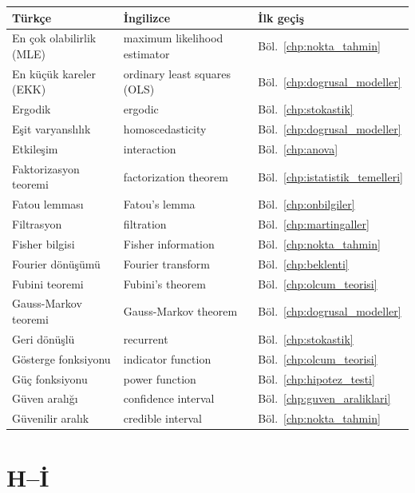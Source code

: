 \begin{tabular}{p{5cm}p{5cm}p{4cm}}
\hline
\textbf{Türkçe} & \textbf{İngilizce} & \textbf{İlk geçiş} \\
\hline
En çok olabilirlik (MLE) & maximum likelihood estimator & Böl.~\ref{chp:nokta_tahmin} \\
En küçük kareler (EKK) & ordinary least squares (OLS) & Böl.~\ref{chp:dogrusal_modeller} \\
Ergodik & ergodic & Böl.~\ref{chp:stokastik} \\
Eşit varyanslılık & homoscedasticity & Böl.~\ref{chp:dogrusal_modeller} \\
Etkileşim & interaction & Böl.~\ref{chp:anova} \\
Faktorizasyon teoremi & factorization theorem & Böl.~\ref{chp:istatistik_temelleri} \\
Fatou lemması & Fatou's lemma & Böl.~\ref{chp:onbilgiler} \\
Filtrasyon & filtration & Böl.~\ref{chp:martingaller} \\
Fisher bilgisi & Fisher information & Böl.~\ref{chp:nokta_tahmin} \\
Fourier dönüşümü & Fourier transform & Böl.~\ref{chp:beklenti} \\
Fubini teoremi & Fubini's theorem & Böl.~\ref{chp:olcum_teorisi} \\
Gauss-Markov teoremi & Gauss-Markov theorem & Böl.~\ref{chp:dogrusal_modeller} \\
Geri dönüşlü & recurrent & Böl.~\ref{chp:stokastik} \\
Gösterge fonksiyonu & indicator function & Böl.~\ref{chp:olcum_teorisi} \\
Güç fonksiyonu & power function & Böl.~\ref{chp:hipotez_testi} \\
Güven aralığı & confidence interval & Böl.~\ref{chp:guven_araliklari} \\
Güvenilir aralık & credible interval & Böl.~\ref{chp:nokta_tahmin} \\
\hline
\end{tabular}

\section{H--İ}

